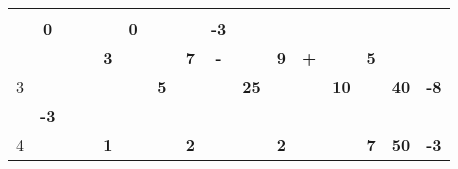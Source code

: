 \documentclass[a4paper, 12pt]{article}
\begin{document}
\begin{table}[H]
\begin{tabular}{|c|cccc|cccc|cccc|cccc|rr|}
          &       & \multicolumn{2}{c}{} &       &       & \multicolumn{2}{c}{} &       &       & \multicolumn{2}{c}{} &       &       & \multicolumn{2}{c}{} &       & \multicolumn{1}{c|}{} &  \bigstrut[b]\\
\cline{2-2}\cline{6-6}\cline{10-10}\cline{14-14}          & \multicolumn{1}{c|}{\textbf{0}} &       &       &       & \multicolumn{1}{c|}{\textbf{0}} &       &       &       & \multicolumn{1}{c|}{\textbf{-3}} &       &       &       & \multicolumn{1}{c|}{} & \multicolumn{2}{c}{} &       & \multicolumn{1}{c|}{} &  \bigstrut\\
    \hline
    \multirow{4}[6]{*}{3} &       &       & \multicolumn{1}{r|}{} & \textbf{3} &       &       & \multicolumn{1}{r|}{} & \cellcolor[rgb]{ 1,  .753,  0}\textbf{7} & \multicolumn{1}{c|}{\cellcolor[rgb]{ 1,  0,  0}\textbf{-}} & \multicolumn{2}{c|}{} & \cellcolor[rgb]{ .439,  .678,  .278}\textbf{9} & \multicolumn{1}{c|}{\cellcolor[rgb]{ 1,  0,  0}\textbf{+}} &       & \multicolumn{1}{r|}{} & \cellcolor[rgb]{ .439,  .678,  .278}\textbf{5} & \multicolumn{1}{c|}{\multirow{4}[6]{*}{\textbf{40}}} & \multicolumn{1}{c|}{\multirow{4}[6]{*}{\textbf{-8}}} \bigstrut\\
\cline{5-5}\cline{9-10}\cline{13-14}\cline{17-17}          &       & \multicolumn{2}{c}{\multirow{2}[2]{*}{}} &       &       & \multicolumn{2}{c}{\multirow{2}[2]{*}{\textbf{5}}} & \multirow{3}[4]{*}{} &       & \multicolumn{2}{c}{\multirow{2}[2]{*}{\textbf{25}}} &       &       & \multicolumn{2}{c}{\multirow{2}[2]{*}{\textbf{10}}} &       & \multicolumn{1}{c|}{} &  \bigstrut[t]\\
          &       & \multicolumn{2}{c}{} &       &       & \multicolumn{2}{c}{} &       &       & \multicolumn{2}{c}{} &       &       & \multicolumn{2}{c}{} &       & \multicolumn{1}{c|}{} &  \bigstrut[b]\\
\cline{2-2}\cline{6-6}\cline{10-10}\cline{14-14}          & \multicolumn{1}{c|}{\textbf{-3}} & \multicolumn{2}{c}{} &       & \multicolumn{1}{c|}{} & \multicolumn{2}{c}{} &       & \multicolumn{1}{c|}{} &       &       &       & \multicolumn{1}{c|}{} & \multicolumn{2}{c}{} &       & \multicolumn{1}{c|}{} &  \bigstrut\\
    \hline
    \multirow{4}[6]{*}{4} &       &       & \multicolumn{1}{r|}{} & \cellcolor[rgb]{ 1,  .753,  0}\textbf{1} &       &       & \multicolumn{1}{r|}{} & \cellcolor[rgb]{ 1,  .753,  0}\textbf{2} &       &       & \multicolumn{1}{r|}{} & \textbf{2} &       &       & \multicolumn{1}{r|}{} & \textbf{7} & \multicolumn{1}{c|}{\multirow{4}[6]{*}{\textbf{50}}} & \multicolumn{1}{c|}{\multirow{4}[6]{*}{\textbf{-3}}} \bigstrut\\

\end{tabular}
\end{table}
\end{document}
